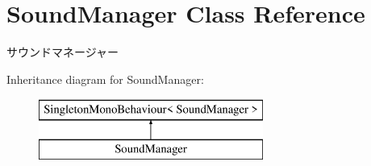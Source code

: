 \hypertarget{class_sound_manager}{}\section{Sound\+Manager Class Reference}
\label{class_sound_manager}


サウンドマネージャー  


Inheritance diagram for Sound\+Manager\+:\begin{figure}[H]
\begin{center}
\leavevmode
\includegraphics[height=2.000000cm]{class_sound_manager}
\end{center}
\end{figure}
